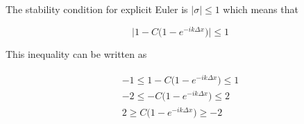 	The stability condition for explicit Euler is $|\sigma| \leq 1$ which means that
	
	\begin{equation}
		\Big|1 - C\Big(1 - e^{-ik\Delta x}\Big)\Big| \leq 1
	\end{equation} 
	
	This inequality can be written as 
	
	\begin{align}
		\begin{split}
			-1 \leq 1 - C\Big(1 - e^{-ik\Delta x}\Big) \leq 1 \\
			-2 \leq - C\Big(1 - e^{-ik\Delta x}\Big) \leq 2 \\
			2 \geq C\Big(1 - e^{-ik\Delta x}\Big) \geq -2 \\
		\end{split}
	\end{align} 
	
